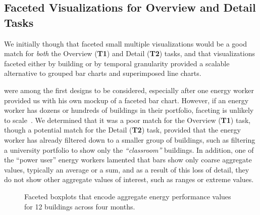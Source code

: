 \documentclass[journal]{vgtc}                %
\newcommand{\bqstart}[1]{\vspace{1mm} \noindent{\textbf{#1}}}
\begin{document}

\subsection{Faceted Visualizations for Overview and Detail Tasks}
\label{design-faceting}



We initially though that faceted small multiple visualizations would be a good match for {\it both} the Overview ({\bf T1}) and Detail ({\bf T2}) tasks, and that visualizations faceted either by building or by temporal granularity provided a scalable alternative to grouped bar charts and superimposed line charts.

\bqstart{Faceted bar charts} were among the first designs to be considered, especially after one energy worker provided us with his own mockup of a faceted bar chart.
However, if an energy worker has dozens or hundreds of buildings in their portfolio, faceting is unlikely to scale~\cite{Javed2010}. 
We determined that it was a poor match for the Overview ({\bf T1}) task, though a potential match for the Detail ({\bf T2}) task, provided that the energy worker has already filtered down to a smaller group of buildings, such as filtering a university portfolio to show only the {\it ``classroom''} buildings.
In addition, one of the ``power user'' energy workers lamented that bars show only coarse aggregate values, typically an average or a sum, and as a result of this loss of detail, they do not show other aggregate values of interest, such as ranges or extreme values.

\begin{figure}[ht]
    \vspace{-0.3cm}
	\centering
	\vspace{-0.3cm}
	\caption{Faceted boxplots that encode aggregate energy performance values for 12 buildings across four months.}
	\label{fig:sandbox-faceted-boxplot}
	\vspace{-0.3cm}
\end{figure} 
\end{document}
